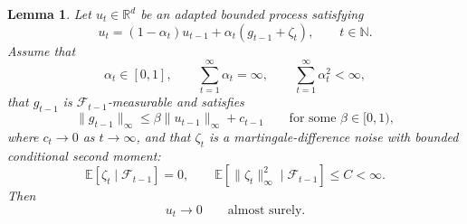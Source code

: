 \documentclass{article}
\numberwithin{equation}{section}
\newtheorem{lemma}{Lemma}
\newcommand{\E}{\mathbb E}
\newcommand{\norm}[1]{\|#1\|}
\newcommand{\R}{\mathbb{R}}
\newcommand{\cF}{\mathcal{F}}
\begin{document}
\begin{lemma}
\label{lem:q_learning_martingale_contraction}
Let \(u_t\in\R^d\) be an adapted bounded process satisfying
\begin{equation}
\label{eq:q_learning_abstract_martingale_recursion}
    u_t
    =
    (1-\alpha_t)u_{t-1}
    +
    \alpha_t(g_{t-1}+\zeta_t),
    \qquad t\in\mathbb{N}.
\end{equation}
Assume that
\[
    \alpha_t\in[0,1],
    \qquad
    \sum_{t=1}^{\infty}\alpha_t=\infty,
    \qquad
    \sum_{t=1}^{\infty}\alpha_t^2<\infty,
\]
that \(g_{t-1}\) is \(\cF_{t-1}\)-measurable and satisfies
\[
    \norm{g_{t-1}}_\infty
    \le
    \beta\norm{u_{t-1}}_\infty+c_{t-1}
    \qquad
    \text{for some }\beta\in[0,1),
\]
where \(c_t\to0\) as \(t\rightarrow\infty\), and that \(\zeta_t\) is a martingale-difference noise with bounded conditional second moment:
\[
    \E[\zeta_t\mid\cF_{t-1}]=0,
    \qquad
    \E[\norm{\zeta_t}_\infty^2\mid\cF_{t-1}]\le C<\infty.
\]
Then
\[
    u_t\to0
    \qquad
    \text{almost surely.}
\]
\end{lemma}
\end{document}
